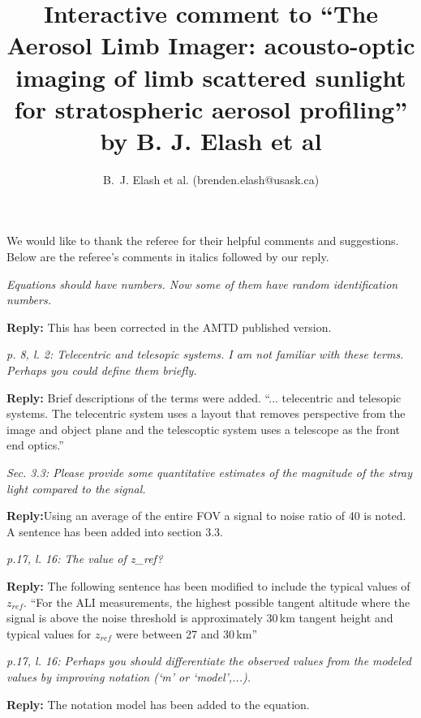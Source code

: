 \documentclass[12pt, notitlepage]{article}
\title{Interactive comment to ``The Aerosol Limb Imager: acousto-optic imaging of limb scattered
sunlight for stratospheric aerosol profiling'' by B. J. Elash et al}
\author{B.~J. Elash et al. (brenden.elash@usask.ca)}
\begin{document}
\begin{titlepage}
\maketitle
\end{titlepage}


We would like to thank the referee for their helpful comments and suggestions. Below are the referee's comments in italics followed by our reply.

\hrulefill

\textit{Equations should have numbers. Now some of them have random identification numbers.}

\textbf{Reply:} This has been corrected in the AMTD published version.

\hrulefill

\textit{p. 8, l. 2: Telecentric and telesopic systems. I am not familiar with these terms. Perhaps you could define them briefly.}

\textbf{Reply:} Brief descriptions of the terms were added. ``... telecentric and telesopic systems. The telecentric system uses a layout that removes perspective from the image and object plane and the telescoptic system uses a telescope as the front end optics.''

\hrulefill

\textit{Sec. 3.3: Please provide some quantitative estimates of the magnitude of the stray light compared to the signal.}

\textbf{Reply:}Using an average of the entire FOV a signal to noise ratio of 40 is noted. A sentence has been added into section 3.3.

\hrulefill

\textit{p.17, l. 16: The value of z\_ref?}

\textbf{Reply:} The following sentence has been modified to include the typical values of $z_{ref}$. ``For the ALI measurements, the highest
possible tangent altitude where the signal is above the noise threshold is
approximately 30\,km tangent height and typical values for $z_{ref}$ were between 27 and 30\,km''

\hrulefill

\textit{p.17, l. 16: Perhaps you should differentiate the observed values from the modeled values by improving notation (`m' or `model',...).}

\textbf{Reply:} The notation model has been added to the equation.

\hrulefill
\end{document}

